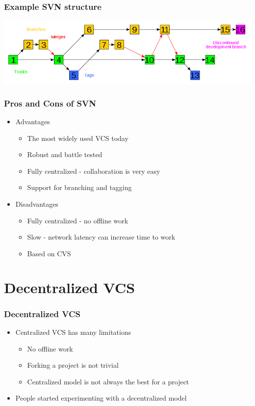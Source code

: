 \documentclass{beamer}
\begin{document}
\begin{frame}
  \frametitle{Example SVN structure}
  \includegraphics[scale = 0.30]{images/Subversion_project_visualization.png}
\end{frame}

\begin{frame}
  \frametitle{Pros and Cons of SVN}
  \begin{itemize}
    \item Advantages
      \begin{itemize}
	\item The most widely used VCS today
	\item Robust and battle tested
	\item Fully centralized - collaboration is very easy
	\item Support for branching and tagging
      \end{itemize}
    \item Disadvantages
      \begin{itemize}
	\item Fully centralized - no offline work
	\item Slow - network latency can increase time to work
	\item Based on CVS
      \end{itemize}
  \end{itemize}
\end{frame}

\section{Decentralized VCS}

\begin{frame}
  \frametitle{Decentralized VCS}
  \begin{itemize}
    \item Centralized VCS has many limitations
      \begin{itemize}
	\item No offline work
	\item Forking a project is not trivial
	\item Centralized model is not always the best for a project
      \end{itemize}
    \item People started experimenting with a decentralized model
  \end{itemize}
\end{frame}
\end{document}
